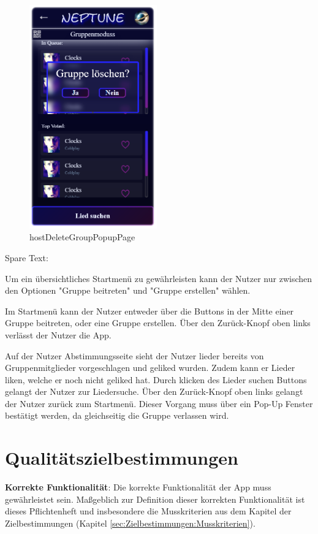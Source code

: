 \documentclass[oneside, ngerman]{sdqtechreport}
\begin{document}
\begin{figure}
   \begin{minipage}[b]{.4\linewidth} %
      \includegraphics[width=5.5cm]{LATEX/Pflichtenheft/GraphicDesigns/hostDeleteGroupPopupPage.png}
      \caption{hostDeleteGroupPopupPage}
   \end{minipage}
\end{figure}

Spare Text:

Um ein übersichtliches Startmenü zu gewährleisten kann der Nutzer nur zwischen den Optionen "Gruppe beitreten" und "Gruppe erstellen" wählen. 

Im Startmenü kann der Nutzer entweder über die Buttons in der Mitte einer Gruppe beitreten, oder eine Gruppe erstellen. Über den Zurück-Knopf oben links verlässt der Nutzer die App.

Auf der Nutzer Abstimmungsseite sieht der Nutzer lieder bereits von Gruppenmitglieder vorgeschlagen und geliked wurden. Zudem kann er Lieder liken, welche er noch nicht geliked hat. Durch klicken des Lieder suchen Buttons gelangt der Nutzer zur Liedersuche. Über den Zurück-Knopf oben links gelangt der Nutzer zurück zum Startmenü. Dieser Vorgang muss über ein Pop-Up Fenster bestätigt werden, da gleichseitig die Gruppe verlassen wird.




\chapter{Qualitätszielbestimmungen}
\label{chap:Qualitätszielbestimmungen}

\textbf{Korrekte Funktionalität}: Die korrekte Funktionalität der App muss gewährleistet sein. Maßgeblich zur Definition dieser korrekten Funktionalität ist dieses Pflichtenheft und insbesondere die Musskriterien aus dem Kapitel der Zielbestimmungen (Kapitel \ref{sec:Zielbestimmungen:Musskriterien}).
\end{document}
